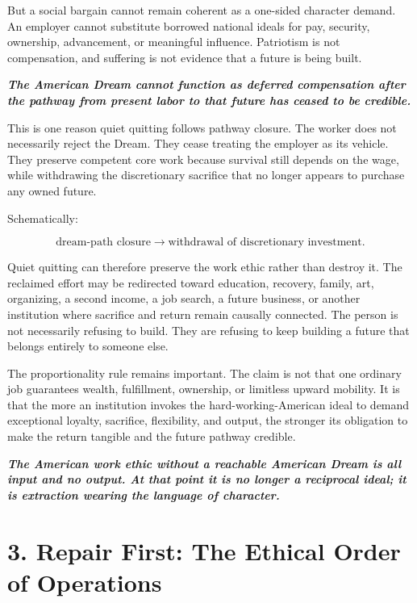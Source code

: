 \documentclass[11pt,oneside]{article}
\renewenvironment{quote}
  {\begin{tcolorbox}[
      enhanced,
      breakable,
      colback=ManifestLight,
      colframe=ManifestRule,
      boxrule=0pt,
      leftrule=3pt,
      arc=0pt,
      outer arc=0pt,
      left=10pt,right=10pt,top=8pt,bottom=8pt,
      before skip=0.8em,after skip=0.8em
    ]\itshape}
  {\end{tcolorbox}}
\begin{document}
But a social bargain cannot remain coherent as a one-sided character
demand. An employer cannot substitute borrowed national ideals for pay,
security, ownership, advancement, or meaningful influence. Patriotism is
not compensation, and suffering is not evidence that a future is being
built.

\begin{quote}
\textbf{The American Dream cannot function as deferred compensation
after the pathway from present labor to that future has ceased to be
credible.}
\end{quote}

This is one reason quiet quitting follows pathway closure. The worker
does not necessarily reject the Dream. They cease treating the employer
as its vehicle. They preserve competent core work because survival still
depends on the wage, while withdrawing the discretionary sacrifice that
no longer appears to purchase any owned future.

Schematically:

\[
\text{dream-path closure}
\longrightarrow
\text{withdrawal of discretionary investment}.
\]

Quiet quitting can therefore preserve the work ethic rather than destroy
it. The reclaimed effort may be redirected toward education, recovery,
family, art, organizing, a second income, a job search, a future
business, or another institution where sacrifice and return remain
causally connected. The person is not necessarily refusing to build.
They are refusing to keep building a future that belongs entirely to
someone else.

The proportionality rule remains important. The claim is not that one
ordinary job guarantees wealth, fulfillment, ownership, or limitless
upward mobility. It is that the more an institution invokes the
hard-working-American ideal to demand exceptional loyalty, sacrifice,
flexibility, and output, the stronger its obligation to make the return
tangible and the future pathway credible.

\begin{quote}
\textbf{The American work ethic without a reachable American Dream is
all input and no output. At that point it is no longer a reciprocal
ideal; it is extraction wearing the language of character.}
\end{quote}

\hypertarget{repair-first-the-ethical-order-of-operations}{%
\section{3. Repair First: The Ethical Order of
Operations}\label{repair-first-the-ethical-order-of-operations}}
\end{document}
